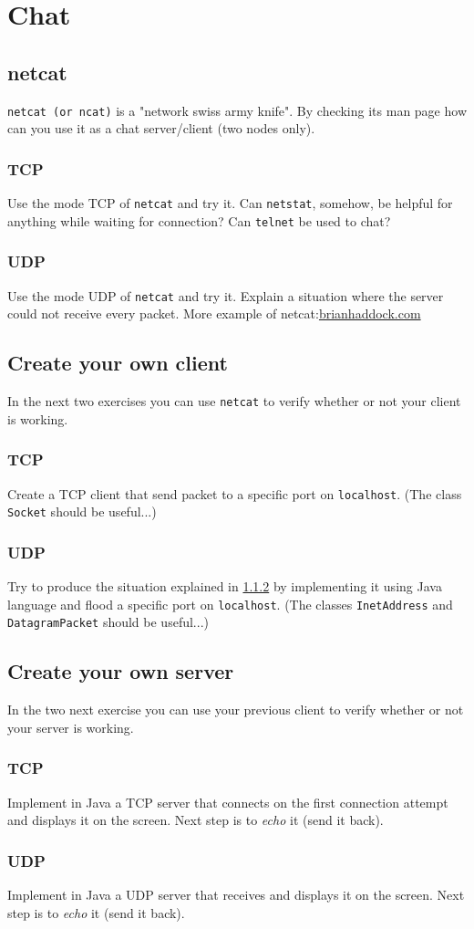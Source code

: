 \documentclass[11pt]{article}
\begin{document}
\section{Chat}
\subsection{netcat}
\verb"netcat (or ncat)" is a "network swiss army knife". By checking its man page how can you use it as a chat server/client (two nodes only).
\subsubsection{TCP}
Use the mode TCP of \verb"netcat" and try it. Can \verb"netstat", somehow, be helpful for anything while waiting for connection? Can \verb"telnet" be used to chat?
\subsubsection{UDP}\label{chat:udp}
Use the mode UDP of \verb"netcat" and try it. Explain a situation where the server could not receive every packet.
\newline
More example of netcat:\color{blue}\href{http://www.brianhaddock.com/2013/8-great-netcat-nc-unix-commands}{brianhaddock.com}\color{black}

\subsection{Create your own client}
In the next two exercises you can use \verb"netcat" to verify whether or not your client is working.
\subsubsection{TCP}
Create a TCP client that send packet to a specific port on \verb"localhost". (The class \verb"Socket" should be useful...)
\subsubsection{UDP}
Try to produce the situation explained in \ref{chat:udp} by implementing it using Java language and flood a specific port on \verb"localhost". (The classes \verb"InetAddress" and \verb"DatagramPacket" should be useful...)

\subsection{Create your own server}
In the two next exercise you can use your previous client to verify whether or not your server is working.
\subsubsection{TCP}
Implement in Java a TCP server that connects on the first connection attempt and displays it on the screen. Next step is to \emph{echo} it (send it back).
\subsubsection{UDP}
Implement in Java a UDP server that receives and displays it on the screen. Next step is to \emph{echo} it (send it back).
\end{document}
